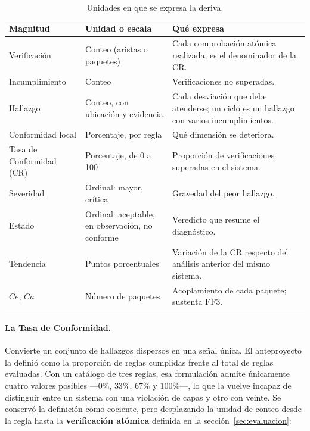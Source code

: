 \begin{table}[H]
\centering
\caption{Unidades en que se expresa la deriva.}
\label{tab:unidades}
\footnotesize
\begin{tabularx}{\textwidth}{>{\raggedright\arraybackslash}p{3.2cm}>{\raggedright\arraybackslash}p{3.3cm}X}
\toprule
\textbf{Magnitud} & \textbf{Unidad o escala} & \textbf{Qué expresa} \\
\midrule
Verificación & Conteo (aristas o paquetes) & Cada comprobación atómica realizada; es el denominador de la CR. \\
Incumplimiento & Conteo & Verificaciones no superadas. \\
Hallazgo & Conteo, con ubicación y evidencia & Cada desviación que debe atenderse; un ciclo es un hallazgo con varios incumplimientos. \\
Conformidad local & Porcentaje, por regla & Qué dimensión se deteriora. \\
Tasa de Conformidad (CR) & Porcentaje, de 0 a 100 & Proporción de verificaciones superadas en el sistema. \\
Severidad & Ordinal: mayor, crítica & Gravedad del peor hallazgo. \\
Estado & Ordinal: aceptable, en observación, no conforme & Veredicto que resume el diagnóstico. \\
Tendencia & Puntos porcentuales & Variación de la CR respecto del análisis anterior del mismo sistema. \\
$Ce$, $Ca$ & Número de paquetes & Acoplamiento de cada paquete; sustenta FF3. \\
\bottomrule
\end{tabularx}
\end{table}

\paragraph{La Tasa de Conformidad.} Convierte un conjunto de hallazgos dispersos en una señal única. El anteproyecto la definió como la proporción de reglas cumplidas frente al total de reglas evaluadas. Con un catálogo de tres reglas, esa formulación admite únicamente cuatro valores posibles ---$0\%$, $33\%$, $67\%$ y $100\%$---, lo que la vuelve incapaz de distinguir entre un sistema con una violación de capas y otro con veinte. Se conservó la definición como cociente, pero desplazando la unidad de conteo desde la regla hasta la \textbf{verificación atómica} definida en la sección~\ref{sec:evaluacion}:

